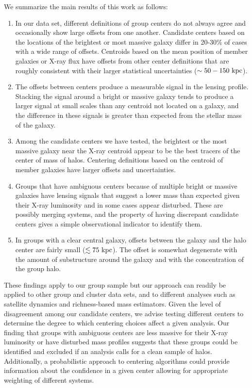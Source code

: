 We summarize the main results of this work as follows:
\begin{enumerate}
\item In our data set, different definitions of group centers do not
  always agree and occasionally show large offsets from one another. Candidate centers
  based on the locations of the brightest or most massive galaxy
  differ in 20-30\% of cases with a wide range of offsets. Centroids based on the
  mean position of member galaxies or X-ray flux have offsets
  from other center definitions that are roughly
  consistent with their larger statistical uncertainties ($\sim50-150~{\rm kpc}$).
\item The offsets between centers produce a measurable signal in the
  lensing profile. Stacking the signal around a bright or massive
  galaxy tends to produce a larger signal at small scales than any
  centroid not located on a galaxy, and the difference in
  these signals is greater than expected from the stellar mass of the galaxy.
\item Among the candidate centers we have tested, the brightest or the
  most massive galaxy near the X-ray centroid appear to be the best
  tracers of the center of mass of halos. Centering definitions based
  on the centroid of member galaxies have larger offsets and uncertainties.
\item Groups that have ambiguous centers because of multiple bright or
  massive galaxies have lensing signals that suggest a lower mass than expected given their X-ray
  luminosity and in some cases appear
    disturbed. These are possibly merging systems, and the property
  of having discrepant candidate centers gives a simple observational
  indicator to identify them.
\item In groups with a clear central galaxy, offsets between the
  galaxy and the halo center are fairly small ($\lesssim 75~{\rm
    kpc}$).  The offset is somewhat degenerate with the amount of
  substructure around the galaxy and with the concentration of the
  group halo.
\end{enumerate}

These findings apply to our group sample but our approach can readily
be applied to other group and cluster data sets, and to different
analyses such as satellite dynamics and richness-based mass
estimators. Given the level of disagreement among our candidate
centers, we advise testing different centers to determine the degree
to which centering choices affect a given analysis. Our finding that groups
with ambiguous centers are less massive for their
  X-ray luminosity or have disturbed mass profiles suggests that
these groups could be identified and excluded if an analysis calls for
a clean sample of halos. Additionally, a probabilistic approach to 
centering algorithms could provide information about the confidence in
a given center allowing for appropriate weighting of different systems.

